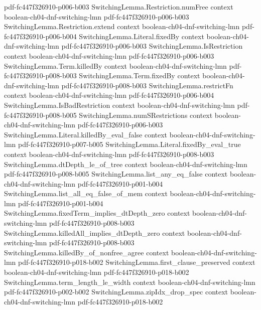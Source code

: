 \begin{theorem}
  {pdf-fc447f326910-p006-b003}
\proofstep
  {SwitchingLemma.Restriction.numFree}
  {context}
  {boolean-ch04-dnf-switching-lmn}
  {pdf-fc447f326910-p006-b003}
\proofstep
  {SwitchingLemma.Restriction.extend}
  {context}
  {boolean-ch04-dnf-switching-lmn}
  {pdf-fc447f326910-p006-b004}
\proofstep
  {SwitchingLemma.Literal.fixedBy}
  {context}
  {boolean-ch04-dnf-switching-lmn}
  {pdf-fc447f326910-p006-b003}
\proofstep
  {SwitchingLemma.IsRestriction}
  {context}
  {boolean-ch04-dnf-switching-lmn}
  {pdf-fc447f326910-p006-b003}
\proofstep
  {SwitchingLemma.Term.killedBy}
  {context}
  {boolean-ch04-dnf-switching-lmn}
  {pdf-fc447f326910-p008-b003}
\proofstep
  {SwitchingLemma.Term.fixedBy}
  {context}
  {boolean-ch04-dnf-switching-lmn}
  {pdf-fc447f326910-p008-b003}
\proofstep
  {SwitchingLemma.restrictFn}
  {context}
  {boolean-ch04-dnf-switching-lmn}
  {pdf-fc447f326910-p006-b004}
\proofstep
  {SwitchingLemma.IsBadRestriction}
  {context}
  {boolean-ch04-dnf-switching-lmn}
  {pdf-fc447f326910-p008-b005}
\proofstep
  {SwitchingLemma.numSRestrictions}
  {context}
  {boolean-ch04-dnf-switching-lmn}
  {pdf-fc447f326910-p006-b003}
\proofstep
  {SwitchingLemma.Literal.killedBy_eval_false}
  {context}
  {boolean-ch04-dnf-switching-lmn}
  {pdf-fc447f326910-p007-b005}
\proofstep
  {SwitchingLemma.Literal.fixedBy_eval_true}
  {context}
  {boolean-ch04-dnf-switching-lmn}
  {pdf-fc447f326910-p008-b003}
\proofstep
  {SwitchingLemma.dtDepth_le_of_tree}
  {context}
  {boolean-ch04-dnf-switching-lmn}
  {pdf-fc447f326910-p008-b005}
\proofstep
  {SwitchingLemma.list_any_eq_false}
  {context}
  {boolean-ch04-dnf-switching-lmn}
  {pdf-fc447f326910-p001-b004}
\proofstep
  {SwitchingLemma.list_all_eq_false_of_mem}
  {context}
  {boolean-ch04-dnf-switching-lmn}
  {pdf-fc447f326910-p001-b004}
\proofstep
  {SwitchingLemma.fixedTerm_implies_dtDepth_zero}
  {context}
  {boolean-ch04-dnf-switching-lmn}
  {pdf-fc447f326910-p008-b003}
\proofstep
  {SwitchingLemma.killedAll_implies_dtDepth_zero}
  {context}
  {boolean-ch04-dnf-switching-lmn}
  {pdf-fc447f326910-p008-b003}
\proofstep
  {SwitchingLemma.killedBy_of_nonfree_agree}
  {context}
  {boolean-ch04-dnf-switching-lmn}
  {pdf-fc447f326910-p018-b002}
\proofstep
  {SwitchingLemma.first_clause_preserved}
  {context}
  {boolean-ch04-dnf-switching-lmn}
  {pdf-fc447f326910-p018-b002}
\proofstep
  {SwitchingLemma.term_length_le_width}
  {context}
  {boolean-ch04-dnf-switching-lmn}
  {pdf-fc447f326910-p002-b002}
\proofstep
  {SwitchingLemma.zipIdx_drop_spec}
  {context}
  {boolean-ch04-dnf-switching-lmn}
  {pdf-fc447f326910-p018-b002}
\proofstep

\end{theorem}
